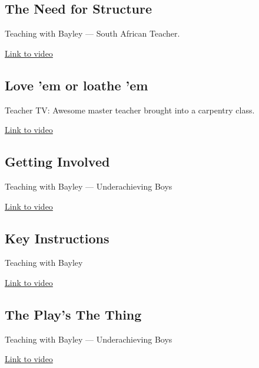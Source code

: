 \documentclass[12pt]{report}
\begin{document}
\begin{appendices}
\subsection{The Need for Structure}

Teaching with Bayley --- South African Teacher.
 
\href{http://archive.teachfind.com/ttv/www.teachers.tv/videos/the-need-for-structure.html}{Link to video}

\subsection{Love 'em or loathe 'em}

Teacher TV: Awesome master teacher brought into a carpentry class.

\href{https://www.youtube.com/watch?v=YUo61Uj4Cmg}{Link to video}

\subsection{Getting Involved}

Teaching with Bayley --- Underachieving Boys

\href{https://www.youtube.com/watch?v=42p59Upj_M4}{Link to video}


\subsection{Key Instructions}

Teaching with Bayley

\href{https://www.youtube.com/watch?v=FP7GyfGKamQ}{Link to video}


\subsection{The Play's The Thing}

Teaching with Bayley --- Underachieving Boys

\href{https://www.youtube.com/watch?v=9196qkVWaLw}{Link to video}





\end{appendices}
\end{document}

